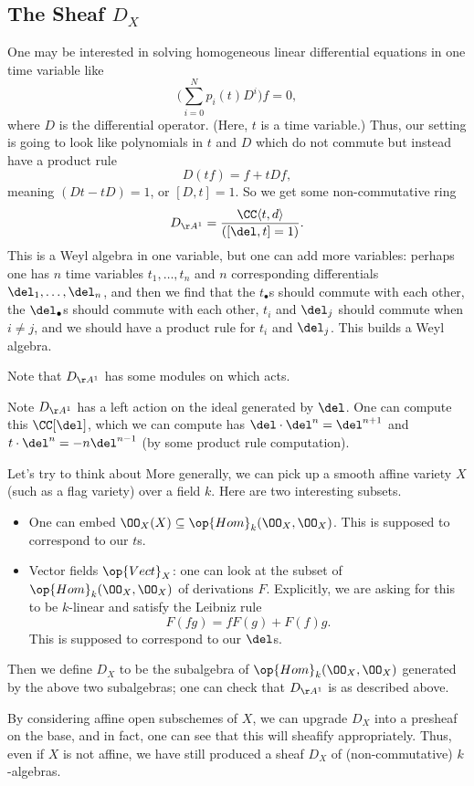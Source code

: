 \documentclass{article}
\begin{document}
\subsection{The Sheaf \texorpdfstring{$D_X$}{ DX}}
One may be interested in solving homogeneous linear differential equations in one time variable like
\[\Bigg(\sum_{i=0}^Np_i(t)D^i\Bigg)f=0,\]
where $D$ is the differential operator. (Here, $t$ is a time variable.) Thus, our setting is going to look like polynomials in $t$ and $D$ which do not commute but instead have a product rule
\[D(tf)=f+tDf,\]
meaning $(Dt-tD)=1$, or $[D,t]=1$. So we get some non-commutative ring
\[D_{\AA^1}=\frac{\CC\langle t,d\rangle}{([\del,t]=1)}.\]
This is a Weyl algebra in one variable, but one can add more variables: perhaps one has $n$ time variables $t_1,\ldots,t_n$ and $n$ corresponding differentials $\del_1,\ldots,\del_n$, and then we find that the $t_\bullet$s should commute with each other, the $\del_\bullet$s should commute with each other, $t_i$ and $\del_j$ should commute when $i\ne j$, and we should have a product rule for $t_i$ and $\del_j$. This builds a Weyl algebra.

Note that $D_{\AA^1}$ has some modules on which acts.
\begin{example}
	Note $D_{\AA^1}$ has a left action on the ideal generated by $\del$. One can compute this $\CC[\del]$, which we can compute has $\del\cdot\del^{n}=\del^{n+1}$ and $t\cdot\del^n=-n\del^{n-1}$ (by some product rule computation).
\end{example}
Let's try to think about More generally, we can pick up a smooth affine variety $X$ (such as a flag variety) over a field $k$. Here are two interesting subsets.
\begin{itemize}
	\item One can embed $\OO_X(X)\subseteq\op{Hom}_k(\OO_X,\OO_X)$. This is supposed to correspond to our $t$s.
	\item Vector fields $\op{Vect}_X$: one can look at the subset of $\op{Hom}_k(\OO_X,\OO_X)$ of derivations $F$. Explicitly, we are asking for this to be $k$-linear and satisfy the Leibniz rule
	\[F(fg)=fF(g)+F(f)g.\]
	This is supposed to correspond to our $\del$s.
\end{itemize}
Then we define $D_X$ to be the subalgebra of $\op{Hom}_k(\OO_X,\OO_X)$ generated by the above two subalgebras; one can check that $D_{\AA^1}$ is as described above.
\begin{remark}
	By considering affine open subschemes of $X$, we can upgrade $D_X$ into a presheaf on the base, and in fact, one can see that this will sheafify appropriately. Thus, even if $X$ is not affine, we have still produced a sheaf $D_X$ of (non-commutative) $k$-algebras. 
\end{remark}
\end{document}
